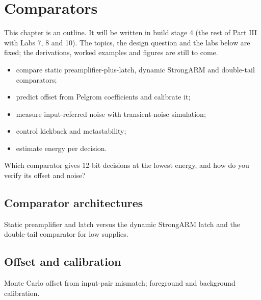 \chapter{Comparators}\label{ch:comparators}

\begin{specnote}
This chapter is an outline. It will be written in build stage 4 (the rest of Part III with Labs 7, 8 and 10). The topics, the design question and the labs below are fixed; the derivations, worked examples and figures are still to come.
\end{specnote}

\begin{objectives}
\begin{itemize}
  \item compare static preamplifier-plus-latch, dynamic StrongARM and double-tail comparators;
  \item predict offset from Pelgrom coefficients and calibrate it;
  \item measure input-referred noise with transient-noise simulation;
  \item control kickback and metastability;
  \item estimate energy per decision.
\end{itemize}
\end{objectives}

\begin{insight}
Which comparator gives 12-bit decisions at the lowest energy, and how do you verify its offset and noise?
\end{insight}

\section{Comparator architectures}\label{sec:ch16-1}
Static preamplifier and latch versus the dynamic StrongARM latch and the double-tail comparator for low supplies.

\section{Offset and calibration}\label{sec:ch16-2}
Monte Carlo offset from input-pair mismatch; foreground and background calibration.

